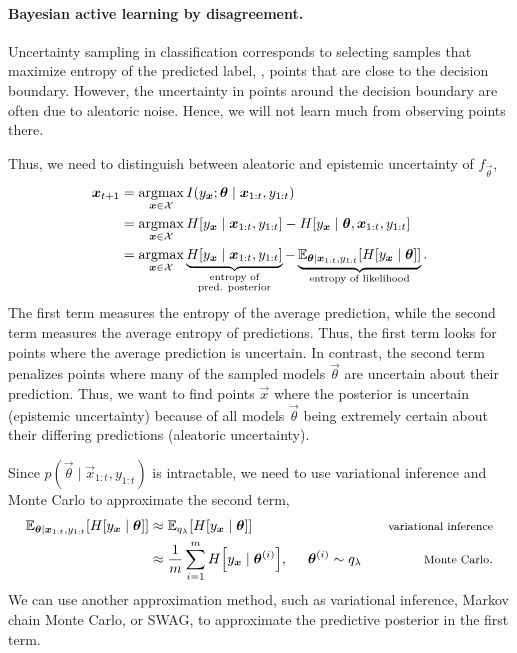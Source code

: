 \paragraph{Bayesian active learning by disagreement.}

Uncertainty sampling in classification corresponds to selecting samples that
maximize entropy of the predicted label, \ie, points that are close to the
decision boundary. However, the uncertainty in points around the decision
boundary are often due to aleatoric noise. Hence, we will not learn much from
observing points there.

Thus, we need to distinguish between aleatoric and epistemic uncertainty of
$f_{\vec{\theta}}$,
\begin{align*}
  \bm{x}_{t+1} &= \operatorname*{argmax}_{\bm{x}\in\mathcal{X}} I(y_{\bm{x}};\bm{\theta}\mid \bm{x}_{1:t},y_{1:t}) \\
  &= \operatorname*{argmax}_{\bm{x}\in\mathcal{X}} H[y_{\bm{x}}\mid \bm{x}_{1:t},y_{1:t}] - H[y_{\bm{x}}\mid\bm{\theta},\bm{x}_{1:t},y_{1:t}] \\
  &= \operatorname*{argmax}_{\bm{x}\in\mathcal{X}} \underbrace{H[y_{\bm{x}}\mid \bm{x}_{1:t},y_{1:t}]}_{\substack{\text{entropy of} \\ \text{pred. posterior}}} - \underbrace{\mathbb{E}_{\bm{\theta}\mid\bm{x}_{1:t},y_{1:t}} [H[y_{\bm{x}}\mid\bm{\theta}]]}_{\text{entropy of likelihood}}
.\end{align*}
The first term measures the entropy of the average prediction, while the
second term measures the average entropy of predictions. Thus, the first term
looks for points where the average prediction is uncertain. In contrast, the
second term penalizes points where many of the sampled models $\vec{\theta}$
are uncertain about their prediction. Thus, we want to find points $\vec{x}$
where the posterior is uncertain (epistemic uncertainty) because of all
models $\vec{\theta}$ being extremely certain about their differing
predictions (aleatoric uncertainty).

Since $p(\vec{\theta}\mid\vec{x}_{1:t},y_{1:t})$ is intractable, we need to use
variational inference and Monte Carlo to approximate the second term,
\begin{align*}
  \mathbb{E}_{\vec{\theta}\mid\vec{x}_{1:t},y_{1:t}} [H[y_{\vec{x}}\mid\vec{\theta}]] &\approx \mathbb{E}_{q_{\lambda}} [H[y_{\vec{x}}\mid\vec{\theta}]] & \text{\footnotesize variational inference} \\
  &\approx \frac{1}{m} \sum_{i=1}^m H\lft[y_{\vec{x}}\mid\vec{\theta}^{(i)}\rgt], \hspace{0.5cm} \vec{\theta}^{(i)}\sim q_{\lambda} & \text{\footnotesize Monte Carlo}.
\end{align*}
We can use another approximation method, such as variational inference,
Markov chain Monte Carlo, or SWAG, to approximate the predictive posterior in
the first term.
